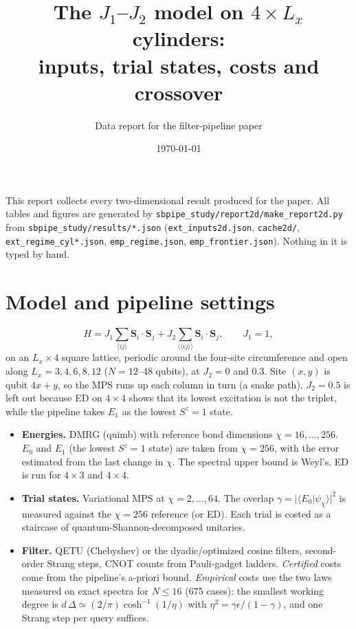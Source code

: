 \documentclass[10pt]{article}
\title{The $J_1$--$J_2$ model on $4\times L_x$ cylinders:\\ inputs, trial states, costs and crossover}
\author{Data report for the filter-pipeline paper}
\date{\today}
\begin{document}
\maketitle

\noindent This report collects every two-dimensional result produced for the paper. All tables and figures are
generated by \texttt{sbpipe\_study/report2d/make\_report2d.py} from \texttt{sbpipe\_study/results/*.json}
(\texttt{ext\_inputs2d.json}, \texttt{cache2d/}, \texttt{ext\_regime\_cyl*.json}, \texttt{emp\_regime.json},
\texttt{emp\_frontier.json}). Nothing in it is typed by hand.

\section{Model and pipeline settings}

\begin{equation}
H=J_1\sum_{\langle ij\rangle}\mathbf S_i\cdot\mathbf S_j+J_2\sum_{\langle\langle ij\rangle\rangle}\mathbf S_i\cdot\mathbf S_j,
\qquad J_1=1,
\end{equation}
on an $L_x\times4$ square lattice, periodic around the four-site circumference and open along $L_x=3,4,6,8,12$
($N=12$--48 qubits), at $J_2=0$ and $0.3$. Site $(x,y)$ is qubit $4x+y$, so the MPS runs up each column in
turn (a snake path). $J_2=0.5$ is left out because ED on $4\times4$ shows that its lowest excitation is not the
triplet, while the pipeline takes $E_1$ as the lowest $S^z=1$ state.

\begin{itemize}
\item \textbf{Energies.} DMRG (quimb) with reference bond dimensions $\chi=16,\dots,256$. $E_0$ and $E_1$ (the
lowest $S^z=1$ state) are taken from $\chi=256$, with the error estimated from the last change in $\chi$. The
spectral upper bound is Weyl's. ED is run for $4\times3$ and $4\times4$.
\item \textbf{Trial states.} Variational MPS at $\chi=2,\dots,64$. The overlap $\gamma=|\langle E_0|\psi_\chi\rangle|^2$
is measured against the $\chi=256$ reference (or ED). Each trial is costed as a staircase of
quantum-Shannon-decomposed unitaries.
\item \textbf{Filter.} QETU (Chebyshev) or the dyadic/optimized cosine filters, second-order Strang steps,
CNOT counts from Pauli-gadget ladders. \emph{Certified} costs come from the pipeline's a-priori
bound. \emph{Empirical} costs use the two laws measured on exact spectra for $N\le16$ (675 cases): the
smallest working degree is $d\,\Delta\simeq(2/\pi)\cosh^{-1}(1/\eta)$ with $\eta^2=\gamma\epsilon/(1-\gamma)$, and one
Strang step per query suffices.
\end{itemize}
\end{document}
